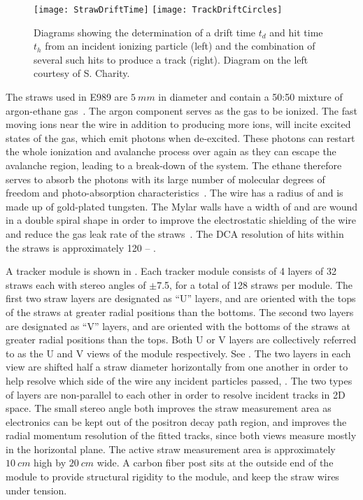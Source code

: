 \begin{figure}
\centering
        \texttt{[image: StrawDriftTime]}
    \hspace{1cm}
        \texttt{[image: TrackDriftCircles]}
\caption[Straw tracker drift circles]{Diagrams showing the determination of a drift time $t_{d}$ and hit time $t_{h}$ from an incident ionizing particle (left) and the combination of several such hits to produce a track (right). Diagram on the left courtesy of S. Charity.}
\label{fig:driftcircles}
\end{figure}




The straws used in E989 are $\SI{5}{mm}$ in diameter and contain a 50:50 mixture of argon-ethane gas~\cite{WTThesis}. The argon component serves as the gas to be ionized. The fast moving ions near the wire in addition to producing more ions, will incite excited states of the gas, which emit photons when de-excited. These photons can restart the whole ionization and avalanche process over again as they can escape the avalanche region, leading to a break-down of the system. The ethane therefore serves to absorb the photons with its large number of molecular degrees of freedom and photo-absorption characteristics~\cite{WTThesis}. The wire has a radius of  and is made up of gold-plated tungsten. The Mylar walls have a width of  and are wound in a double spiral shape in order to improve the electrostatic shielding of the wire and reduce the gas leak rate of the straws~\cite{WTThesis}. The DCA resolution of hits within the straws is approximately \SI{120}{} -- .





A tracker module is shown in . Each tracker module consists of 4 layers of 32 straws each with stereo angles of $\pm$7.5\textdegree{}, for a total of 128 straws per module. The first two straw layers are designated as ``U'' layers, and are oriented with the tops of the straws at greater radial positions than the bottoms. The second two layers are designated as ``V'' layers, and are oriented with the bottoms of the straws at greater radial positions than the tops. Both U or V layers are collectively referred to as the U and V views of the module respectively. See . The two layers in each view are shifted half a straw diameter horizontally from one another in order to help resolve which side of the wire any incident particles passed, . The two types of layers are non-parallel to each other in order to resolve incident tracks in 2D space. The small stereo angle both improves the straw measurement area as electronics can be kept out of the positron decay path region, and improves the radial momentum resolution of the fitted tracks, since both views measure mostly in the horizontal plane. The active straw measurement area is approximately $\SI{10}{cm}$ high by $\SI{20}{cm}$ wide. A carbon fiber post sits at the outside end of the module to provide structural rigidity to the module, and keep the straw wires under tension. 


